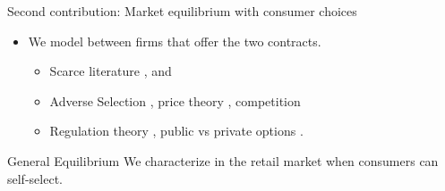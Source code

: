 \documentclass{class}
\begin{document}



\begin{frame}{Second contribution: Market equilibrium with consumer choices}\label{SecondCont}


\begin{itemize}

\item We model  between firms that offer the two contracts. 

\vfill

\begin{itemize}
    \item Scarce literature \cite{joskow2006retail}, \cite{Borenstein2003} and \cite{ancel2025tariffs}

\vfill

        \item Adverse Selection \cite{1970Akerlof}, price theory \cite{Einav2012}, competition \cite{Azevedo2017}
\vfill

\item Regulation theory \cite{laffont1993theory}, public vs private options \cite{Martimort2020a,Kang2023a}.

\end{itemize}
\end{itemize}


\vfill

\begin{mainbox}{General Equilibrium}
We characterize  in the retail market when consumers can self-select.
\end{mainbox}

\end{frame}
\end{document}
